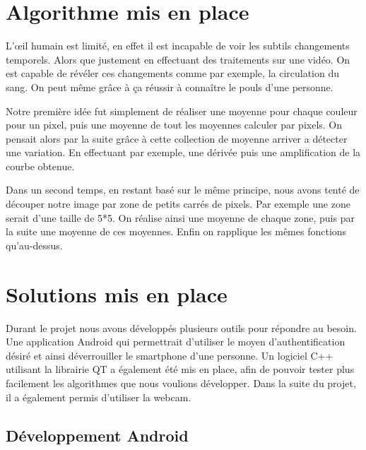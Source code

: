 \section{Algorithme mis en place}

L’œil humain est limité, en effet il est incapable de voir les subtils changements temporels. Alors
que justement en effectuant des traitements sur une vidéo. On est capable de révéler ces changements
comme par exemple, la circulation du sang. On peut même grâce à ça réussir à connaître le pouls d'une
personne. 

Notre première idée fut simplement de réaliser une moyenne pour chaque couleur pour un pixel, puis 
une moyenne de tout les moyennes calculer par pixels. On pensait alors par la suite grâce à cette 
collection de moyenne arriver a détecter une variation. En effectuant par exemple, une dérivée puis
une amplification de la courbe obtenue.  

Dans un second temps, en restant basé sur le même principe, nous avons tenté de découper notre image
par zone de petits carrés de pixels. Par exemple une zone serait d'une taille de 5*5. On réalise 
ainsi une moyenne de chaque zone, puis par la suite une moyenne de ces moyennes. Enfin on rapplique
les mêmes fonctions qu'au-dessus.

\section{Solutions mis en place}

Durant le projet nous avons développés plusieurs outils pour répondre au besoin. Une application Android qui permettrait d'utiliser le moyen d'authentification désiré et ainsi déverrouiller le smartphone d'une
personne. Un logiciel C++ utilisant la librairie QT a également été mis en place, afin de pouvoir tester plus facilement les algorithmes que nous voulions développer. Dans la suite du projet, il a également
permis d'utiliser la webcam. 

\subsection{Développement Android}

